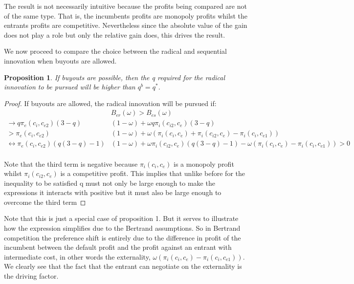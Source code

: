\documentclass[11pt]{article}
\newtheorem{proposition}{Proposition}
\begin{document}
The result is not necessarily intuitive because the profits being compared are not of the same type. That is, the incumbents profits are monopoly profits whilst the entrants profits are competitive. Nevertheless since the absolute value of the gain does not play a role but only the relative gain does, this drives the result. 

We now proceed to compare the choice between the radical and sequential innovation when buyouts are allowed.

\begin{proposition}
\label{higherq}
If buyouts are possible, then the q required for the radical innovation to be pursued will be higher than $q^b=q^*$. 
\end{proposition}

\begin{proof}
If buyouts are allowed, the radical innovation will be pursued if:
\begin{align*}
&B_{er}(\omega)>B_{es}(\omega) \\
\rightarrow q \pi_{e}(c_{i},c_{e2})(3-q)&(1-\omega)
+ \omega q 
\pi_{i}(c_{i2},c_{e}) (3-q) \\
> \pi_{e}(c_{i},c_{e2})&(1-\omega)+ \omega (\pi_{i}(c_{i},c_{e}) +  \pi_{i}(c_{i2},c_{e}) - \pi_{i}(c_{i},c_{e1}) ) \\
\leftrightarrow \pi_{e}(c_{i},c_{e2})(q(3-q)-1)&(1-\omega)
+ \omega \pi_{i}(c_{i2},c_{e}) (q(3-q)-1)-\omega(\pi_{i}(c_{i},c_{e})- \pi_{i}(c_{i},c_{e1})) 
> 0 \\
\end{align*}

Note that the third term is negative because $\pi_{i}(c_{i},c_{e})$ is a monopoly profit whilst  $\pi_{i}(c_{i2},c_{e})$ is a competitive profit. This implies that unlike before for the inequality to be satisfied q must not only be large enough to make the expressions it interacts with positive but it must also be large enough to overcome the third term 
\end{proof}

Note that this is just a special case of proposition 1. But it serves to illustrate how the expression simplifies due to the Bertrand assumptions. So in Bertrand competition the preference shift is entirely due to the difference in profit of the incumbent between the default profit and the profit against an entrant with intermediate cost, in other words the externality,   $\omega(\pi_i(c_i,c_e)- \pi_i(c_i,c_{e1})) $. We clearly see that the fact that the entrant can negotiate on the externality is the driving factor. 
\end{document}
